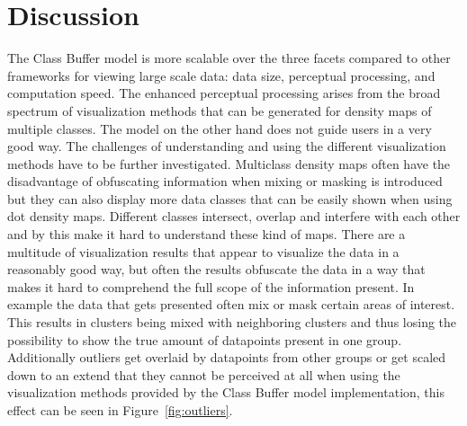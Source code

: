 \section{Discussion}

The Class Buffer model is more scalable over the three facets compared to other frameworks for viewing large scale data: data size, perceptual processing, and computation speed.
The enhanced perceptual processing arises from the broad spectrum of visualization methods that can be generated for density maps of multiple classes.
The model on the other hand does not guide users in a very good way. The challenges of understanding and using the different visualization methods have to be further investigated.
Multiclass density maps often have the disadvantage of obfuscating information when mixing or masking is introduced but they can also display more data classes that can be easily shown when using dot density maps. Different classes intersect, overlap and interfere with each other and by this make it hard to understand these kind of maps.
There are a multitude of visualization results that appear to visualize the data in a reasonably good way, but often the results obfuscate the data in a way that makes it hard to comprehend the full scope of the information present. In example the data that gets presented often mix or mask certain areas of interest. This results in clusters being mixed with neighboring clusters and thus losing the possibility to show the true amount of datapoints present in one group. Additionally outliers get overlaid by datapoints from other groups or get scaled down to an extend that they cannot be perceived at all when using the visualization methods provided by the Class Buffer model implementation, this effect can be seen in Figure~\ref{fig:outliers}.

